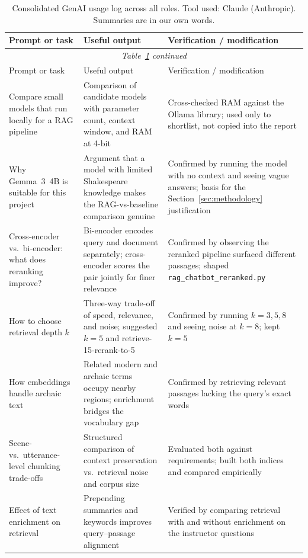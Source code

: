 \renewcommand{\arraystretch}{1.25}
\begin{longtable}{@{}p{3.4cm} p{6.2cm} p{6.2cm}@{}}
\caption{Consolidated GenAI usage log across all roles. Tool used:
Claude (Anthropic). Summaries are in our own words.}
\label{tab:genai-log}\\
\toprule
Prompt or task & Useful output & Verification / modification \\
\midrule
\endfirsthead
\multicolumn{3}{c}{\footnotesize\itshape Table~\ref{tab:genai-log} continued}\\
\toprule
Prompt or task & Useful output & Verification / modification \\
\midrule
\endhead
\bottomrule
\endlastfoot
Compare small models that run locally for a RAG pipeline &
Comparison of candidate models with parameter count, context window, and
RAM at 4-bit &
Cross-checked RAM against the Ollama library; used only to shortlist, not
copied into the report \\
Why Gemma~3~4B is suitable for this project &
Argument that a model with limited Shakespeare knowledge makes the
RAG-vs-baseline comparison genuine &
Confirmed by running the model with no context and seeing vague answers;
basis for the Section~\ref{sec:methodology} justification \\
Cross-encoder vs.\ bi-encoder: what does reranking improve? &
Bi-encoder encodes query and document separately; cross-encoder scores
the pair jointly for finer relevance &
Confirmed by observing the reranked pipeline surfaced different passages;
shaped \texttt{rag\_chatbot\_reranked.py} \\
How to choose retrieval depth $k$ &
Three-way trade-off of speed, relevance, and noise; suggested $k=5$ and
retrieve-15-rerank-to-5 &
Confirmed by running $k=3,5,8$ and seeing noise at $k=8$; kept $k=5$ \\
How embeddings handle archaic text &
Related modern and archaic terms occupy nearby regions; enrichment
bridges the vocabulary gap &
Confirmed by retrieving relevant passages lacking the query's exact words \\
Scene- vs.\ utterance-level chunking trade-offs &
Structured comparison of context preservation vs.\ retrieval noise and
corpus size &
Evaluated both against requirements; built both indices and compared
empirically \\
Effect of text enrichment on retrieval &
Prepending summaries and keywords improves query--passage alignment &
Verified by comparing retrieval with and without enrichment on the
instructor questions \\

\end{longtable}
